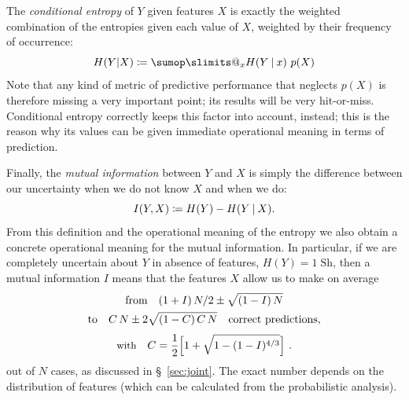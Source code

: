 \documentclass[\ifafour a4paper,12pt,\else a5paper,10pt,\fi%
onecolumn,oneside,article,%
british%
]{memoir}
\makeatletter
\theoremstyle{remark}
\theoremstyle{innote}
\def\sum{\DOTSI\sumop\slimits@}
\newcommand*{\de}{\partialup}%
\newcommand*{\defd}{\coloneqq}
\newcommand*{\p}{\mathrm{p}}%
\renewcommand*{\|}[1][]{\nonscript\:#1\vert\nonscript\:\mathopen{}}
\newcommand*{\sect}{\S}%
\newcommand*{\tsum}{\mathop{\textstyle\sum}\nolimits}
\newcommand*{\bit}{\textrm{Sh}}
\makeatother
\begin{document}
The \emph{conditional entropy} of $Y$ given features $X$ is exactly the
weighted combination of the entropies given each value of $X$, weighted by
their frequency of occurrence:
\begin{equation}
  \label{eq:cond_entr}
  H(Y|X) \defd \sum_{x} H(Y\|x)\ p(X)
\end{equation}
Note that any kind of metric of predictive performance that neglects $p(X)$
is therefore missing a very important point; its results will be very
hit-or-miss. Conditional entropy correctly keeps this factor into account,
instead; this is the reason why its values can be given immediate
operational meaning in terms of prediction.


Finally, the \emph{mutual information}  between $Y$ and $X$ is simply the
difference between our uncertainty when we do not know $X$ and when we do:
\begin{equation}
  \label{eq:mutualinfo}
  I(Y,X) \defd H(Y) - H(Y\|X).
\end{equation}
From this definition and the operational meaning of the entropy we also
obtain a concrete operational meaning for the mutual information. In
particular, if we are completely uncertain about $Y$ in absence of
features, $H(Y)=1\;\bit$, then a mutual information $I$ means that the
features $X$ allow us to make on average 
\begin{multline}
  \label{eq:entropy_est}
    \text{from}\quad (1+I)\,N/2 \pm \sqrt{(1-I)\,N} \\
    \text{to}\quad   C\,N \pm 2\sqrt{(1-C)\,C\,N}
    \quad \text{correct predictions,}
    \\[1\jot]
    \text{\small with}\quad C = \frac{1}{2}\Bigl[1+\sqrt{1-(1-I)^{4/3}}\Bigr] \ .
\end{multline}
out of $N$ cases, as discussed in \sect~\ref{sec:joint}. The exact number
depends on the distribution of features (which can be calculated from the
probabilistic analysis).




\end{document}
